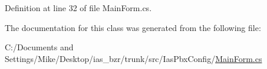 Definition at line 32 of file MainForm.cs.

The documentation for this class was generated from the following file:\begin{DoxyCompactItemize}
\item 
C:/Documents and Settings/Mike/Desktop/ias\_\-bzr/trunk/src/IasPbxConfig/\hyperlink{_main_form_8cs}{MainForm.cs}\end{DoxyCompactItemize}
